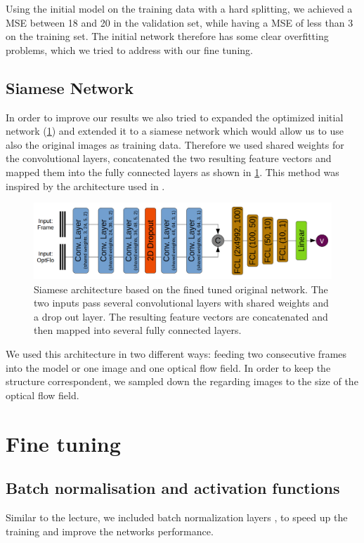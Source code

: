 \documentclass[conference]{IEEEtran}
\begin{document}
Using the initial model on the training data with a hard splitting, we achieved a MSE between 18 and 20 
in the validation set, while having a MSE of less than 3 on the training set. The initial network 
therefore has some clear overfitting problems, which we tried to address with our fine tuning.

\subsection{Siamese Network}
\label{subsec:SiameseNetork}
In order to improve our results we also tried to expanded the optimized initial network (\cref{sec:fineTuning}) and extended
it to a siamese network which would allow us to use also the original images as training data. Therefore we used shared weights for the convolutional layers, concatenated 
the two resulting feature vectors and mapped them into the fully connected layers as shown in \cref{fig:siameseNetwork}. This method was inspired by the architecture used in
\cite{Wang2017}. 
\begin{figure}[ht]
	\centering
	\includegraphics[width=0.9\columnwidth]{imgs/siamese_model.png}
	\caption{Siamese architecture based on the fined tuned original network. The two inputs pass 
	several convolutional layers with shared weights and a drop out layer. The resulting
	feature vectors are concatenated and then mapped into several fully connected layers.}
	\label{fig:siameseNetwork}
\end{figure}
We used this architecture in two different ways: feeding two consecutive frames into the model or one image and one optical flow field. In order to keep the structure correspondent, we sampled down the regarding images to the size of the optical flow field.

\section{Fine tuning}
\label{sec:fineTuning}

\subsection{Batch normalisation and activation functions}
Similar to the lecture, we included batch normalization layers \cite{BatchNorm2015}, to speed up
the training and improve the networks performance.
\end{document}

